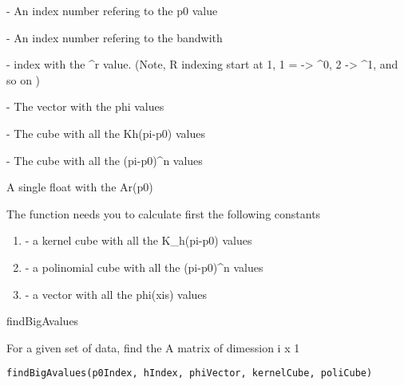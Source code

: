 \documentclass[letterpaper]{book}
\begin{document}
%
\begin{Arguments}
\begin{ldescription}
\item[\code{p0}] - An index number refering to the p0 value

\item[\code{h}] - An index number refering to the bandwith

\item[\code{r}] - index with the \textasciicircum{}r value. (Note, R indexing start at 1, 1 = -> \textasciicircum{}0, 2 -> \textasciicircum{}1, and so on )

\item[\code{phiVector}] - The vector with the phi values

\item[\code{kernelCube}] - The cube with all the Kh(pi-p0) values

\item[\code{poliCube}] - The cube with all the (pi-p0)\textasciicircum{}n values
\end{ldescription}
\end{Arguments}
%
\begin{Value}
A single float with the Ar(p0)
\end{Value}
%
\begin{Note}\relax
The function needs you to calculate first the following constants

\begin{enumerate}

\item{} - a kernel cube with all the K\_h(pi-p0) values
\item{} - a polinomial cube with all the (pi-p0)\textasciicircum{}n values
\item{} - a vector with all the phi(xis) values

\end{enumerate}

\end{Note}
%
\begin{SeeAlso}\relax
findBigAvalues
\end{SeeAlso}
%
\begin{Description}\relax
For a given set of data, find the A matrix of dimession i x 1
\end{Description}
%
\begin{Usage}
\begin{verbatim}
findBigAvalues(p0Index, hIndex, phiVector, kernelCube, poliCube)
\end{verbatim}
\end{Usage}
\end{document}
